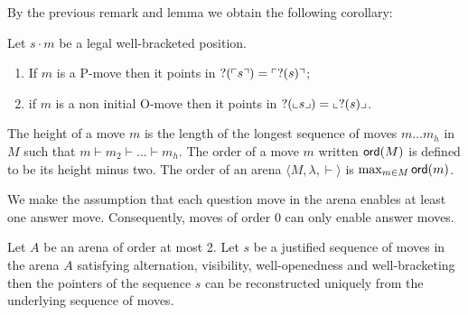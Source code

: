 \vspace{10pt}
By the previous remark and lemma we obtain the following corollary:
\begin{cor}
\label{cor:pendingview}
Let $s \cdot m$ be a legal well-bracketed position.
\begin{enumerate}
\item If $m$ is a P-move then it points in $?(\ulcorner s \urcorner) = \ulcorner ?(s) \urcorner$;
\item if $m$ is a non initial O-move then it points in $?(\llcorner s \lrcorner) = \llcorner ?(s) \lrcorner$.
\end{enumerate}

\end{cor}



The height of a move $m$ is the length of the longest sequence of moves
$m \ldots m_h$ in $M$ such that $m \vdash m_2 \vdash \ldots \vdash m_h$.
The order of a move $m$ written ${\sf ord}(M)$ is defined to be its height minus two.
The order of an arena $\langle M, \lambda, \vdash \rangle$ is $\max_{m \in M} {\sf ord}(m)$.

We make the assumption that each question move in the arena enables at least one answer move. Consequently, moves of order $0$ can only
enable answer moves.

\begin{lem}
Let $A$ be an arena of order at most 2. Let $s$ be a justified
sequence of moves in the arena $A$ satisfying
 alternation, visibility, well-openedness and well-bracketing then
the pointers of the sequence $s$ can be reconstructed uniquely from
the underlying sequence of moves.
\end{lem}



